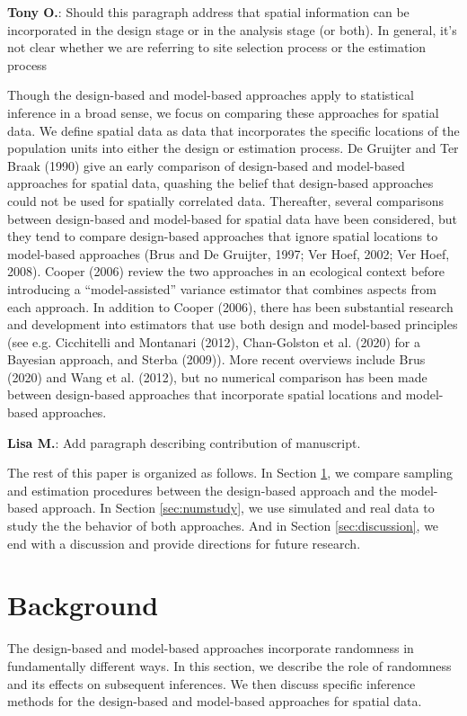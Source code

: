 \documentclass[]{elsarticle} %
\begin{document}
\textbf{Tony O.}: Should this paragraph address that spatial information
can be incorporated in the design stage or in the analysis stage (or
both). In general, it's not clear whether we are referring to site
selection process or the estimation process

Though the design-based and model-based approaches apply to statistical
inference in a broad sense, we focus on comparing these approaches for
spatial data. We define spatial data as data that incorporates the
specific locations of the population units into either the design or
estimation process. De Gruijter and Ter Braak (1990) give an early
comparison of design-based and model-based approaches for spatial data,
quashing the belief that design-based approaches could not be used for
spatially correlated data. Thereafter, several comparisons between
design-based and model-based for spatial data have been considered, but
they tend to compare design-based approaches that ignore spatial
locations to model-based approaches (Brus and De Gruijter, 1997; Ver
Hoef, 2002; Ver Hoef, 2008). Cooper (2006) review the two approaches in
an ecological context before introducing a ``model-assisted'' variance
estimator that combines aspects from each approach. In addition to
Cooper (2006), there has been substantial research and development into
estimators that use both design and model-based principles (see e.g.
Cicchitelli and Montanari (2012), Chan-Golston et al. (2020) for a
Bayesian approach, and Sterba (2009)). More recent overviews include
Brus (2020) and Wang et al. (2012), but no numerical comparison has been
made between design-based approaches that incorporate spatial locations
and model-based approaches.

\textbf{Lisa M.}: Add paragraph describing contribution of manuscript.

The rest of this paper is organized as follows. In Section
\ref{sec:background}, we compare sampling and estimation procedures
between the design-based approach and the model-based approach. In
Section \ref{sec:numstudy}, we use simulated and real data to study the
the behavior of both approaches. And in Section \ref{sec:discussion}, we
end with a discussion and provide directions for future research.

\hypertarget{sec:background}{%
\section{Background}\label{sec:background}}

The design-based and model-based approaches incorporate randomness in
fundamentally different ways. In this section, we describe the role of
randomness and its effects on subsequent inferences. We then discuss
specific inference methods for the design-based and model-based
approaches for spatial data.
\end{document}
